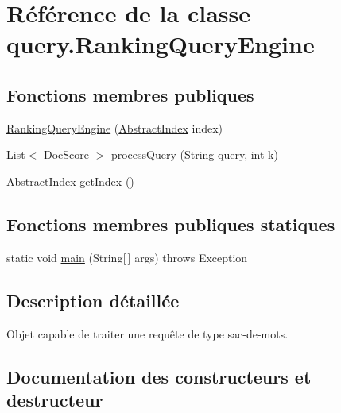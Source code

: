 \hypertarget{classquery_1_1RankingQueryEngine}{}\section{Référence de la classe query.\+Ranking\+Query\+Engine}
\label{classquery_1_1RankingQueryEngine}
\subsection*{Fonctions membres publiques}
\begin{DoxyCompactItemize}
\item 
\hyperlink{classquery_1_1RankingQueryEngine_aad15deb15e9e5b2dbc78421f311b94be}{Ranking\+Query\+Engine} (\hyperlink{classindexation_1_1AbstractIndex}{Abstract\+Index} index)
\item 
List$<$ \hyperlink{classquery_1_1DocScore}{Doc\+Score} $>$ \hyperlink{classquery_1_1RankingQueryEngine_ac69937232cafd9108d96ef3657735682}{process\+Query} (String query, int k)
\item 
\hyperlink{classindexation_1_1AbstractIndex}{Abstract\+Index} \hyperlink{classquery_1_1RankingQueryEngine_a8fef863acbc5aeea67f3d1eac48c06d1}{get\+Index} ()
\end{DoxyCompactItemize}
\subsection*{Fonctions membres publiques statiques}
\begin{DoxyCompactItemize}
\item 
static void \hyperlink{classquery_1_1RankingQueryEngine_ab83cc958288fcdfede4ae5d9a3bdf0fa}{main} (String\mbox{[}$\,$\mbox{]} args)  throws Exception  	
\end{DoxyCompactItemize}


\subsection{Description détaillée}
Objet capable de traiter une requête de type sac-\/de-\/mots. 

\subsection{Documentation des constructeurs et destructeur}
\mbox{\label{classquery_1_1RankingQueryEngine_aad15deb15e9e5b2dbc78421f311b94be}} 
